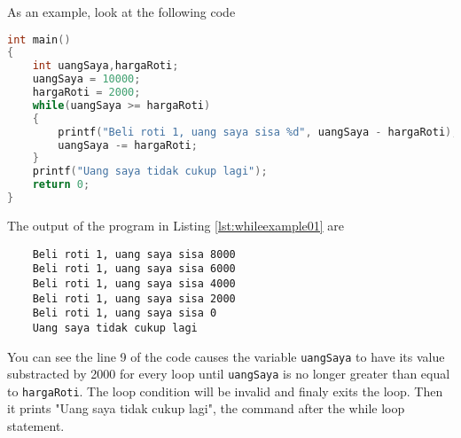 As an example, look at the following code
\begin{lstlisting}[language=c,caption = Contoh Penggunaan while,label=lst:whileexample01]
int main()
{
	int uangSaya,hargaRoti;
	uangSaya = 10000;
	hargaRoti = 2000;
	while(uangSaya >= hargaRoti)
	{
	    printf("Beli roti 1, uang saya sisa %d", uangSaya - hargaRoti);
	    uangSaya -= hargaRoti;
	}
	printf("Uang saya tidak cukup lagi");
	return 0;
}
\end{lstlisting}  
The output of the program in Listing \ref{lst:whileexample01} are
\begin{verbatim}
    Beli roti 1, uang saya sisa 8000
    Beli roti 1, uang saya sisa 6000
    Beli roti 1, uang saya sisa 4000
    Beli roti 1, uang saya sisa 2000
    Beli roti 1, uang saya sisa 0
    Uang saya tidak cukup lagi
\end{verbatim}

You can see the line 9 of the code causes the variable \verb|uangSaya| to have its value substracted by 2000 for every loop until \verb|uangSaya| is no longer greater than equal to \verb|hargaRoti|. 
The loop condition will be invalid and finaly exits the loop. Then it prints "Uang saya tidak cukup lagi", the command after the while loop statement.
